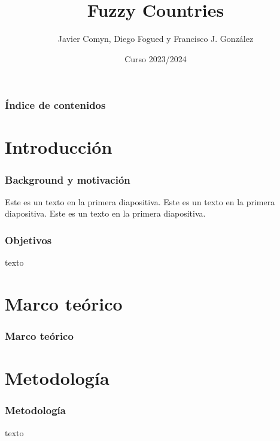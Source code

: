 \documentclass{beamer}
\title{Fuzzy Countries}
\author{Javier Comyn, Diego Fogued y Francisco J. González}
\institute{Universidad Politécnica de Madrid}
\date{Curso 2023/2024}
\newcommand{\slideauthor}[1]{\def\insertslideauthor{#1}}
\newcommand{\insertslideauthor}{}
\begin{document}
\frame{\titlepage}

\begin{frame}
\frametitle{Índice de contenidos}
\tableofcontents
\end{frame}

\section{Introducción}
\begin{frame}
\frametitle{Background y motivación}
Este es un texto en la primera diapositiva. Este es un texto en la primera diapositiva. Este es un texto en la primera diapositiva.
\end{frame}
\begin{frame}
\frametitle{Objetivos}
texto
\end{frame}

\section{Marco teórico}
\begin{frame}
\frametitle{Marco teórico}
\slideauthor{Autor 2}

\end{frame}

\section{Metodología}
\begin{frame}
\frametitle{Metodología}
\slideauthor{Autor 2}
texto
\end{frame}
\end{document}
